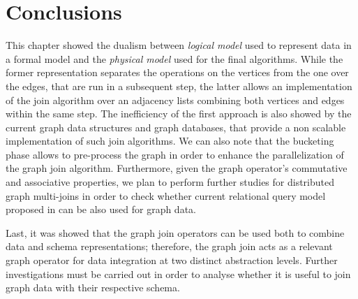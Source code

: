 
\section{Conclusions}
This chapter showed the dualism between \textit{logical model} used to represent data in a formal model and the \textit{physical model}  used for the final algorithms. While the former representation separates the operations on the vertices from the one over the edges, that are run in a subsequent step, the latter allows an implementation of the join algorithm over an adjacency lists combining both vertices and edges within the same step. The inefficiency of the first approach is also showed by the current graph data structures and graph databases, that provide a non scalable implementation of such join algorithms. We can also note that the bucketing phase allows to pre-process the graph in order to enhance the parallelization of the graph join algorithm. Furthermore, given the graph operator's commutative and associative properties, we plan to perform further studies for distributed graph multi-joins in order to check whether current relational query model proposed in \cite{AmelootGKNS17} can be also used for graph data.

Last, it was showed that the graph join operators can be used both to combine data and schema representations; therefore, the graph join acts as a relevant graph operator for data integration at two distinct abstraction levels. Further investigations must be carried out in order to analyse whether it is useful to join graph data with their respective schema.
